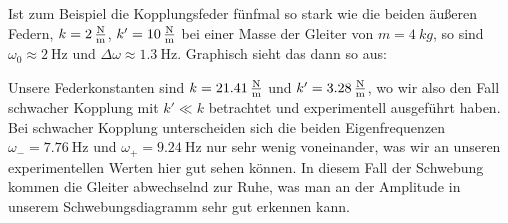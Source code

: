 \documentclass{article}
\begin{document}
              Ist zum Beispiel die Kopplungsfeder fünfmal so stark wie die beiden äußeren Federn, \(k = \SI{2}{\frac{\newton}{\metre}}\), \(k' = \SI{10}{\frac{\newton}{\metre}}\)
              bei einer Masse der Gleiter von \(m = \SI{4}{kg}\), so sind \(\omega_0 \approx \SI{2}{\hertz}\) und \(\Delta \omega \approx \SI{1.3}{\hertz}\).
              Graphisch sieht das dann so aus: \\

              Unsere Federkonstanten sind \(k = \SI{21.41}{\frac{\newton}{\metre}} \) und \(k' = \SI{3.28}{\frac{\newton}{\metre}}\),
              wo wir also den Fall schwacher Kopplung mit \(k' \ll k\) betrachtet und experimentell ausgeführt haben.
              Bei schwacher Kopplung unterscheiden sich die beiden Eigenfrequenzen \(\omega_{-} = \SI{7.76}{\hertz} \) und \( \omega_{+} = \SI{9.24}{\hertz}\)
              nur sehr wenig voneinander, was wir an unseren experimentellen Werten hier gut sehen können.
              In diesem Fall der Schwebung kommen die Gleiter abwechselnd zur Ruhe, was man an der Amplitude in unserem Schwebungsdiagramm sehr gut erkennen kann.
\end{document}
